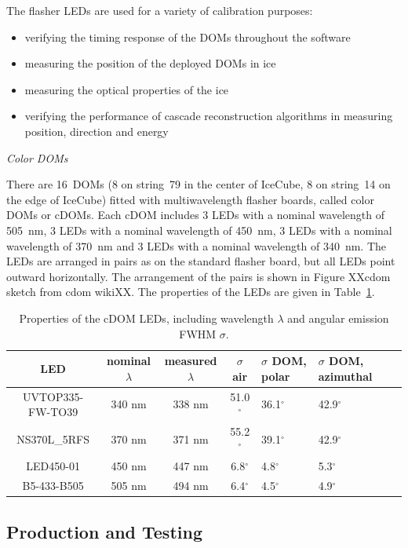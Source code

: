 The flasher LEDs are used for a variety of calibration purposes:
\begin{itemize}
\item verifying the timing response of the DOMs throughout the
  software
\item measuring the position of the deployed DOMs in ice
\item measuring the optical properties of the ice
\item verifying the performance of cascade reconstruction algorithms
  in measuring position, direction and energy
\end{itemize}

{\it Color DOMs}

There are 16~DOMs (8 on string~79 in the center of IceCube, 8 on
string~14 on the edge of IceCube) fitted with multiwavelength flasher boards, called
color DOMs or cDOMs. Each cDOM includes 3 LEDs with a nominal
wavelength of 505~nm, 3 LEDs with a nominal wavelength of 450~nm, 3
LEDs with a nominal wavelength of 370~nm and 3 LEDs with a nominal
wavelength of 340~nm. The LEDs are arranged in pairs as on the
standard flasher board, but all LEDs point outward horizontally. The
arrangement of the pairs is shown in Figure XXcdom sketch from cdom
wikiXX. The properties of the LEDs are given in
Table~\ref{table:cdom_properties}.

\begin{table}
\caption{Properties of the cDOM LEDs, including wavelength $\lambda$ and
  angular emission FWHM $\sigma$.}
\begin{tabularx}{\linewidth}{|c|c|c|c|X|X|X|}
  \hline
 LED& nominal $\lambda$ & measured $\lambda$ & $\sigma$ air & $\sigma$
 DOM, polar & $\sigma$ DOM, azimuthal \\
\hline
UVTOP335-FW-TO39 &340 nm&338 nm&	51.0$^{\circ}$ &	36.1$^{\circ}$ &	42.9$^{\circ}$\\
\hline
NS370L\_5RFS &370 nm&	371 nm&55.2$^{\circ}$&	39.1$^{\circ}$&	42.9$^{\circ}$\\
\hline
LED450-01 & 450 nm& 447 nm&	6.8$^{\circ}$ &	4.8$^{\circ}$ &	5.3$^{\circ}$ \\
\hline
B5-433-B505 & 505 nm& 494 nm& 6.4$^{\circ}$ &	4.5$^{\circ}$ 	&4.9$^{\circ}$ \\
\hline
\end{tabularx}
\label{table:cdom_properties}
\end{table}

\subsection{\label{sec:dom_prodtest}  Production and Testing}

